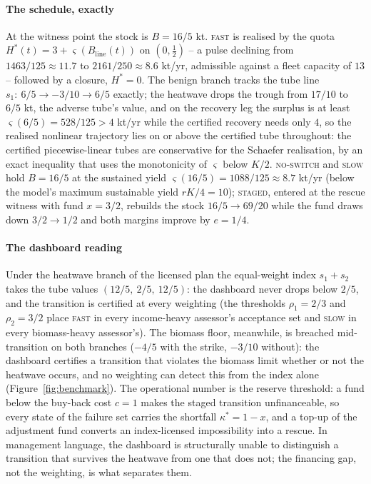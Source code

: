 \documentclass[preprint,11pt,authoryear]{elsarticle}
\theoremstyle{definition}
\theoremstyle{remark}
\newcommand{\act}[1]{\textsc{#1}}
\begin{document}
\paragraph{The schedule, exactly} At the witness point the stock is $B=16/5$ kt. \act{fast} is realised by the quota $H^*(t)=3+\varsigma(B_{\mathrm{line}}(t))$ on $(0,\tfrac12)$ -- a pulse declining from $1463/125\approx11.7$ to $2161/250\approx8.6$ kt/yr, admissible against a fleet capacity of $13$ -- followed by a closure, $H^*=0$. The benign branch tracks the tube line $s_1:\ 6/5\to-3/10\to6/5$ exactly; the heatwave drops the trough from $17/10$ to $6/5$ kt, the adverse tube's value, and on the recovery leg the surplus is at least $\varsigma(6/5)=528/125>4$ kt/yr while the certified recovery needs only $4$, so the realised nonlinear trajectory lies on or above the certified tube throughout: the certified piecewise-linear tubes are conservative for the Schaefer realisation, by an exact inequality that uses the monotonicity of $\varsigma$ below $K/2$. \act{no-switch} and \act{slow} hold $B=16/5$ at the sustained yield $\varsigma(16/5)=1088/125\approx8.7$ kt/yr (below the model's maximum sustainable yield $rK/4=10$); \act{staged}, entered at the rescue witness with fund $x=3/2$, rebuilds the stock $16/5\to69/20$ while the fund draws down $3/2\to1/2$ and both margins improve by $e=1/4$.

\paragraph{The dashboard reading} Under the heatwave branch of the licensed plan the equal-weight index $s_1+s_2$ takes the tube values $(12/5,\ 2/5,\ 12/5)$: the dashboard never drops below $2/5$, and the transition is certified at every weighting (the thresholds $\rho_1=2/3$ and $\rho_2=3/2$ place \act{fast} in every income-heavy assessor's acceptance set and \act{slow} in every biomass-heavy assessor's). The biomass floor, meanwhile, is breached mid-transition on both branches ($-4/5$ with the strike, $-3/10$ without): the dashboard certifies a transition that violates the biomass limit whether or not the heatwave occurs, and no weighting can detect this from the index alone (Figure~\ref{fig:benchmark}). The operational number is the reserve threshold: a fund below the buy-back cost $c=1$ makes the staged transition unfinanceable, so every state of the failure set carries the shortfall $\kappa^*=1-x$, and a top-up of the adjustment fund converts an index-licensed impossibility into a rescue. In management language, the dashboard is structurally unable to distinguish a transition that survives the heatwave from one that does not; the financing gap, not the weighting, is what separates them.
\end{document}
